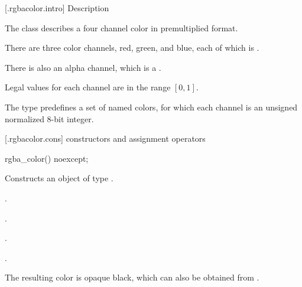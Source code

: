  [\iotwod.rgbacolor.intro] { Description}

\pnum
{}%
The class  describes a four channel color in premultiplied format.

\pnum
There are three color channels, red, green, and blue, each of which is .

\pnum
There is also an alpha channel, which is a .

\pnum
Legal values for each channel are in the range $[0, 1]$.

\pnum
The type predefines a set of named colors, for which each channel is an unsigned normalized 8-bit integer.

 [\iotwod.rgbacolor.cons] { constructors and assignment operators}

\begin{itemdecl}
	rgba_color() noexcept;
\end{itemdecl}
\begin{itemdescr}
	\pnum
	\effects
	Constructs an object of type .
	
	\pnum
	\postconditions
	.
	
	\pnum
	.
	
	\pnum
	.
	
	\pnum
	.
	
	\pnum
	\realnote
	The resulting color is opaque black, which can also be obtained from .
\end{itemdescr}

